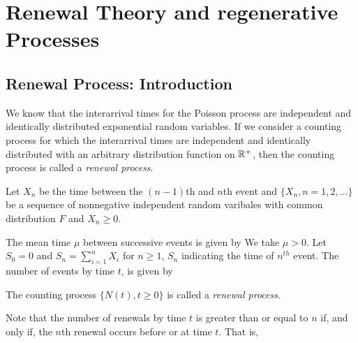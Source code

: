 \documentclass[all-lectures.tex]{subfiles}
\author{}
\begin{document}
\setcounter{chapter}{1}
\chapter{Renewal Theory and regenerative Processes}

\setcounter{section}{0}
\section*{}
\chr
\section{Renewal Process: Introduction}
We know that the interarrival times for the Poisson process are independent and identically distributed exponential random variables.
If we consider a counting process for which the interarrival times are independent and identically distributed with an arbitrary distribution function on $\mathbb{R}^+$, then the counting process is called a \textit{renewal process}.

Let $X_n$ be the time between the $(n-1)$th and $n$th event and $\{X_n,n=1,2,\dots\}$ be a sequence of nonnegative independent random varibales with common distribution $F$ and $X_n \ge 0$.

The mean time $\mu$ between successive events is given by
We take $\mu > 0$. Let $S_0=0$ and $S_n = \sum_{i=1}^{n} X_i$ for $n \ge 1$, $S_n$ indicating the time of $n^{th}$ event.
The number of events by time $t$, is given by

\begin{defn}
The counting process $\{ N(t),t \ge 0\}$ is called a \textit{renewal process}.
\end{defn}

Note that the number of renewals by time $t$ is greater than or equal to $n$ if, and only if, the $n$th renewal occurs before or at time $t$.
That is,
\end{document}
